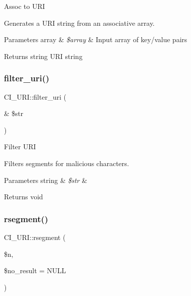 Assoc to U\+RI

Generates a U\+RI string from an associative array.


\begin{DoxyParams}[1]{Parameters}
array & {\em \$array} & Input array of key/value pairs \\
\hline
\end{DoxyParams}
\begin{DoxyReturn}{Returns}
string U\+RI string 
\end{DoxyReturn}
\mbox{\label{class_c_i___u_r_i_a992695f50081ab498b0c5025665d869f}} 
\subsubsection{\texorpdfstring{filter\+\_\+uri()}{filter\_uri()}}
{\footnotesize\ttfamily C\+I\+\_\+\+U\+R\+I\+::filter\+\_\+uri (\begin{DoxyParamCaption}\item[{\&}]{\$str }\end{DoxyParamCaption})}

Filter U\+RI

Filters segments for malicious characters.


\begin{DoxyParams}[1]{Parameters}
string & {\em \$str} & \\
\hline
\end{DoxyParams}
\begin{DoxyReturn}{Returns}
void 
\end{DoxyReturn}
\mbox{\label{class_c_i___u_r_i_a4422392b9c56eb253491e8744a6f0ff5}} 
\subsubsection{\texorpdfstring{rsegment()}{rsegment()}}
{\footnotesize\ttfamily C\+I\+\_\+\+U\+R\+I\+::rsegment (\begin{DoxyParamCaption}\item[{}]{\$n,  }\item[{}]{\$no\+\_\+result = {\ttfamily NULL} }\end{DoxyParamCaption})}

